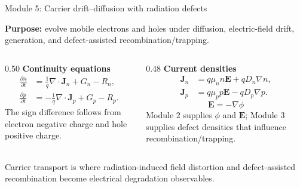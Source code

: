 \documentclass[aspectratio=169,9pt]{beamer}
\newcommand{\grad}{\nabla}
\newcommand{\divg}{\nabla\!\cdot}
\newcommand{\E}{\bm{E}}
\newcommand{\J}{\bm{J}}
\begin{document}
\begin{frame}{Module 5: Carrier drift--diffusion with radiation defects}
\footnotesize
\vspace{-3mm}
\begin{bluebox}
\centering
\textbf{Purpose:} evolve mobile electrons and holes under diffusion, electric-field drift, generation, and defect-assisted recombination/trapping.
\end{bluebox}

\vspace{1mm}
\begin{columns}[T,totalwidth=\textwidth]
\begin{column}{0.50\textwidth}
\textbf{Continuity equations}
\begin{align*}
\boxed{\frac{\partial n}{\partial t}}&\boxed{=\frac{1}{q}\divg\J_n+G_n-R_n},\\
\boxed{\frac{\partial p}{\partial t}}&\boxed{=-\frac{1}{q}\divg\J_p+G_p-R_p.}
\end{align*}
\small
The sign difference follows from electron negative charge and hole positive charge.
\end{column}
\begin{column}{0.48\textwidth}
\textbf{Current densities}
\begin{align*}
\boxed{\J_n}&\boxed{=q\mu_n n\E+qD_n\grad n},\\
\boxed{\J_p}&\boxed{=q\mu_p p\E-qD_p\grad p.}
\end{align*}
\begin{equation*}
\boxed{\E=-\grad\phi}
\end{equation*}
\small
Module 2 supplies \(\phi\) and \(\E\); Module 3 supplies defect densities that influence recombination/trapping.
\end{column}
\end{columns}

\vspace{1mm}
\begin{greenbox}
\centering\scriptsize
Carrier transport is where radiation-induced field distortion and defect-assisted recombination become electrical degradation observables.
\end{greenbox}
\end{frame}
\end{document}

